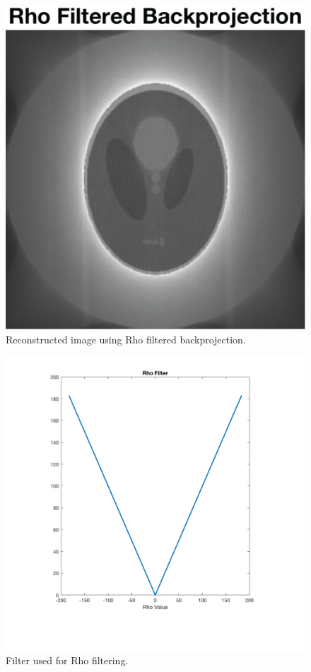 \documentclass[12pt]{article}
\begin{document}
\begin{figure}[H]
	\includegraphics[width=\textwidth]{rhoFilt.png}
	\caption{Reconstructed image using Rho filtered backprojection.}
	\label{rho}
\end{figure}

\begin{figure}[H]
	\includegraphics[width=\textwidth]{Filter.png}
	\caption{Filter used for Rho filtering.}
	\label{filt}
\end{figure}
\end{document}
